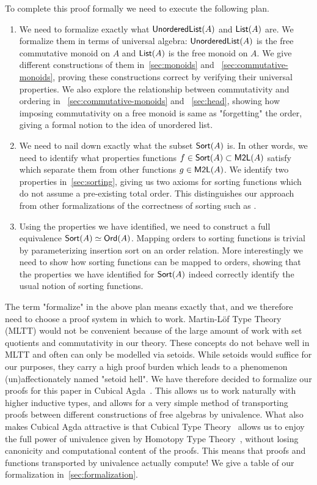 To complete this proof formally we need to execute the following plan.
\begin{enumerate}
    \item We need to formalize exactly what $\operatorname{\mathsf{UnorderedList}}(A)$ and $\operatorname{\mathsf{List}}(A)$ are.
    We formalize them in terms of universal algebra: $\operatorname{\mathsf{UnorderedList}}(A)$ is 
    the free commutative monoid on $A$ and $\operatorname{\mathsf{List}}(A)$ is the free monoid on $A$. We give
    different constructions of them in~\cref{sec:monoids} and ~\cref{sec:commutative-monoids},
    proving these constructions correct by verifying their universal properties.
    We also explore the relationship between commutativity and ordering in
    ~\cref{sec:commutative-monoids} and ~\cref{sec:head},
    showing how imposing commutativity on a free monoid is same as "forgetting" the order,
    giving a formal notion to the idea of unordered list.
    \item We need to nail down exactly what the subset $\operatorname{\mathsf{Sort}}(A)$ is. In other words, we need to
    identify what properties functions $f \in \operatorname{\mathsf{Sort}}(A) \subset \operatorname{\mathsf{M2L}}(A)$ satisfy which separate
    them from other functions $g \in \operatorname{\mathsf{M2L}}(A)$. We identify two properties in~\cref{sec:sorting},
    giving us two axioms for sorting functions which do not assume a pre-existing total order. This distinguishes our approach 
    from other formalizations of the correctness of sorting such as 
    \cite{appelVerifiedFunctionalAlgorithms2023}.
    \item Using the properties we have identified, we need to construct a full equivalence
    $\operatorname{\mathsf{Sort}}(A) \simeq \operatorname{\mathsf{Ord}}(A)$. Mapping orders to sorting functions is
    trivial by parameterizing insertion sort on an order relation. More interestingly we need to show how sorting functions
    can be mapped to orders, showing that the properties we have identified for $\operatorname{\mathsf{Sort}}(A)$ indeed
    correctly identify the usual notion of sorting functions.
\end{enumerate}

The term "formalize" in the above plan means exactly that, and we therefore need to choose a proof system in which to work. Martin-L\"of Type Theory (MLTT) would not be convenient because of the large amount of work with set quotients and commutativity in our theory. These concepts do not behave well in MLTT and often can only be modelled via setoids. While setoids would suffice for
our purposes, they carry a high proof burden which leads to a
phenomenon (un)affectionately named "setoid hell". We have therefore decided to formalize our proofs
for this paper in Cubical Agda~\cite{vezzosiCubicalAgdaDependently2019}. This allows us to work  naturally with
higher inductive types, and allows for a very simple method of transporting proofs between
different constructions of free algebras by univalence. What also makes Cubical Agda attractive
is that Cubical Type Theory~\cite{cohenCubicalTypeTheory2018}
allows us to enjoy the full power of univalence given by
Homotopy Type Theory~\cite{univalentfoundationsprogramHomotopyTypeTheory2013}, 
without losing canonicity and computational content of the proofs. This means that proofs and functions
transported by univalence actually compute!
We give a table of our formalization in~\cref{sec:formalization}.

